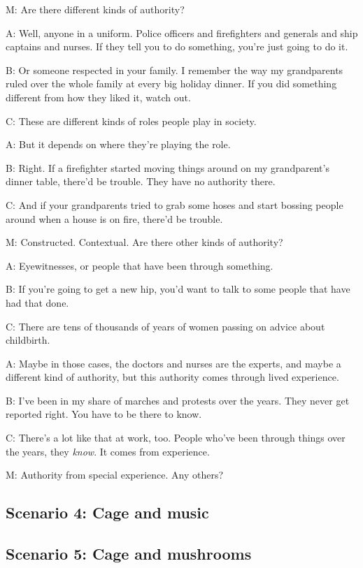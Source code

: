 \documentclass[17pt]{extarticle}
\begin{document}
M:  Are there different kinds of authority?

A:  Well, anyone in a uniform.  Police officers and firefighters and generals and ship captains and nurses.  If they tell you to do something, you're just going to do it.

B:  Or someone respected in your family.  I remember the way my grandparents ruled over the whole family at every big holiday dinner.  If you did something different from how they liked it, watch out.

C:  These are different kinds of roles people play in society.

A:  But it depends on where they're playing the role.

B:  Right.  If a firefighter started moving things around on my grandparent's dinner table, there'd be trouble.  They have no authority there.

C:  And if your grandparents tried to grab some hoses and start bossing people around when a house is on fire, there'd be trouble.

M:  Constructed.  Contextual.  Are there other kinds of authority?

A:  Eyewitnesses, or people that have been through something.

B:  If you're going to get a new hip, you'd want to talk to some people that have had that done.

C:  There are tens of thousands of years of women passing on advice about childbirth.

A:  Maybe in those cases, the doctors and nurses are the experts, and maybe a different kind of authority, but this authority comes through lived experience.

B:  I've been in my share of marches and protests over the years.  They never get reported right.  You have to be there to know.

C:  There's a lot like that at work, too.  People who've been through things over the years, they \textit{know}.  It comes from experience.

M:  Authority from special experience.  Any others?

\newpage

\subsection{Scenario 4: Cage and music}

\newpage

\subsection{Scenario 5: Cage and mushrooms}
\end{document}
